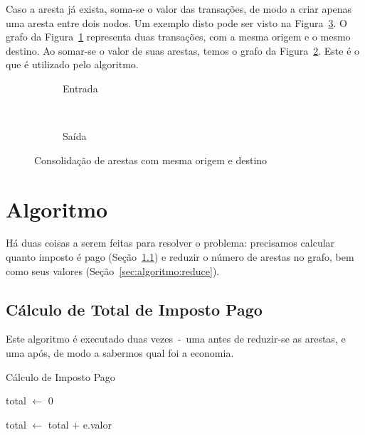 \documentclass[12pt]{article}
\begin{document}
Caso a aresta já exista, soma-se o valor das transações, de modo a criar apenas
uma aresta entre dois nodos. Um exemplo disto pode ser visto na
Figura~\ref{fig:double_edge}. O grafo da Figura~\ref{fig:double_edge:bad}
representa duas transações, com a mesma origem e o mesmo destino. Ao somar-se o
valor de suas arestas, temos o grafo da Figura~\ref{fig:double_edge:good}. Este
é o que é utilizado pelo algoritmo.

\begin{figure}[htb!]
  \centering
  \begin{subfigure}[b]{0.5\textwidth}
    \begin{dot2tex}[neato,options=-tmath]
        
    \end{dot2tex}
    \caption{Entrada}
    \label{fig:double_edge:bad}
  \end{subfigure}%
  ~
  \begin{subfigure}[b]{0.5\textwidth}
    \begin{dot2tex}[neato,options=-tmath]
        
    \end{dot2tex}
    \caption{Saída}
    \label{fig:double_edge:good}
  \end{subfigure}
  \caption{Consolidação de arestas com mesma origem e destino}
  \label{fig:double_edge}
\end{figure}


\section{Algoritmo}\label{sec:algoritmo}

Há duas coisas a serem feitas para resolver o problema: precisamos calcular
quanto imposto é pago (Seção~\ref{sec:algoritmo:total_tax}) e reduzir o número
de arestas no grafo, bem como seus valores (Seção~\ref{sec:algoritmo:reduce}).

\subsection{Cálculo de Total de Imposto Pago}\label{sec:algoritmo:total_tax}

Este algoritmo é executado duas vezes~-~uma antes de reduzir-se as arestas, e
uma após, de modo a sabermos qual foi a economia.

\begin{algorithm}[H]
  \caption{Cálculo de Imposto Pago}
  \label{alg:total_tax}
  total $\gets$ $0$

  {
    total $\gets$ total $+$ e.valor
  }
\end{algorithm}
\end{document}
